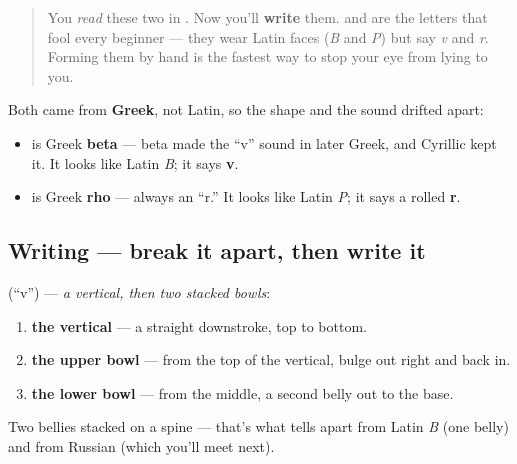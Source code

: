 \label{lesson:RU-W01-false-friends-v-r}



\begin{quote}
You \emph{read} these two in \emph{}. Now you'll \textbf{write} them. \textbf{} and \textbf{} are the letters that fool every beginner — they wear Latin faces (\emph{B} and \emph{P}) but say \emph{v} and \emph{r}. Forming them by hand is the fastest way to stop your eye from lying to you.
\end{quote}

\begin{culture}
Both came from \textbf{Greek}, not Latin, so the shape and the sound drifted apart:

\begin{itemize}
\raggedright
  \item \textbf{} is Greek \textbf{beta} — beta made the \textquotedblleft{}v\textquotedblright{} sound in later Greek, and Cyrillic kept it. It looks like Latin \emph{B}; it says \textbf{v}.
  \item \textbf{} is Greek \textbf{rho} — always an \textquotedblleft{}r.\textquotedblright{} It looks like Latin \emph{P}; it says a rolled \textbf{r}.
\end{itemize}
\end{culture}

\subsection*{Writing — break it apart, then write it}

\textbf{} (\textquotedblleft{}v\textquotedblright{}) — \emph{a vertical, then two stacked bowls}:

\begin{enumerate}
\raggedright
  \item \textbf{the vertical} — a straight downstroke, top to bottom.
  \item \textbf{the upper bowl} — from the top of the vertical, bulge out right and back in.
  \item \textbf{the lower bowl} — from the middle, a second belly out to the base.
\end{enumerate}

Two bellies stacked on a spine — that's what tells \textbf{} apart from Latin \emph{B} (one belly) and from Russian \textbf{} (which you'll meet next).

